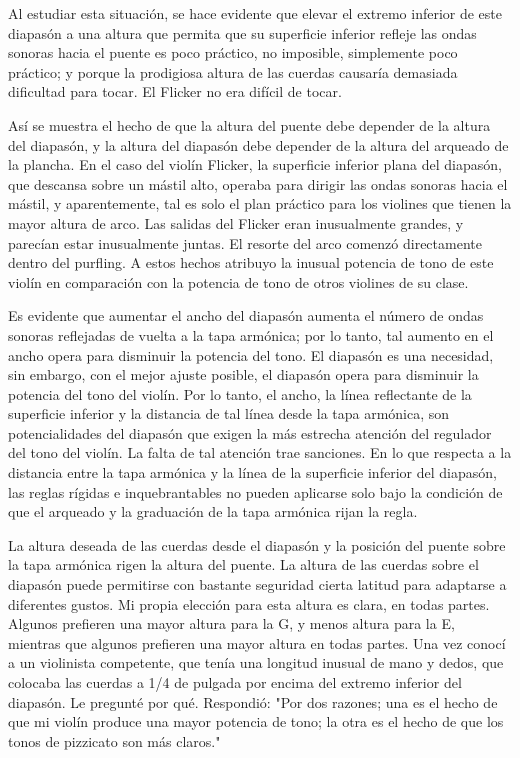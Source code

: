 \documentclass[12pt]{book}
\begin{document}
Al estudiar esta situación, se hace evidente que elevar el extremo inferior de este diapasón a una altura que permita que su superficie inferior refleje las ondas sonoras hacia el puente es poco práctico, no imposible, simplemente poco práctico; y porque la prodigiosa altura de las cuerdas causaría demasiada dificultad para tocar. El Flicker no era difícil de tocar.

Así se muestra el hecho de que la altura del puente debe depender de la altura del diapasón, y la altura del diapasón debe depender de la altura del arqueado de la plancha. En el caso del violín Flicker, la superficie inferior plana del diapasón, que descansa sobre un mástil alto, operaba para dirigir las ondas sonoras hacia el mástil, y aparentemente, tal es solo el plan práctico para los violines que tienen la mayor altura de arco. Las salidas del Flicker eran inusualmente grandes, y parecían estar inusualmente juntas. El resorte del arco comenzó directamente dentro del purfling. A estos hechos atribuyo la inusual potencia de tono de este violín en comparación con la potencia de tono de otros violines de su clase.

Es evidente que aumentar el ancho del diapasón aumenta el número de ondas sonoras reflejadas de vuelta a la tapa armónica; por lo tanto, tal aumento en el ancho opera para disminuir la potencia del tono. El diapasón es una necesidad, sin embargo, con el mejor ajuste posible, el diapasón opera para disminuir la potencia del tono del violín. Por lo tanto, el ancho, la línea reflectante de la superficie inferior y la distancia de tal línea desde la tapa armónica, son potencialidades del diapasón que exigen la más estrecha atención del regulador del tono del violín. La falta de tal atención trae sanciones. En lo que respecta a la distancia entre la tapa armónica y la línea de la superficie inferior del diapasón, las reglas rígidas e inquebrantables no pueden aplicarse solo bajo la condición de que el arqueado y la graduación de la tapa armónica rijan la regla.

La altura deseada de las cuerdas desde el diapasón y la posición del puente sobre la tapa armónica rigen la altura del puente. La altura de las cuerdas sobre el diapasón puede permitirse con bastante seguridad cierta latitud para adaptarse a diferentes gustos. Mi propia elección para esta altura es clara, en todas partes. Algunos prefieren una mayor altura para la G, y menos altura para la E, mientras que algunos prefieren una mayor altura en todas partes. Una vez conocí a un violinista competente, que tenía una longitud inusual de mano y dedos, que colocaba las cuerdas a 1/4 de pulgada por encima del extremo inferior del diapasón. Le pregunté por qué. Respondió: "Por dos razones; una es el hecho de que mi violín produce una mayor potencia de tono; la otra es el hecho de que los tonos de pizzicato son más claros."
\end{document}
